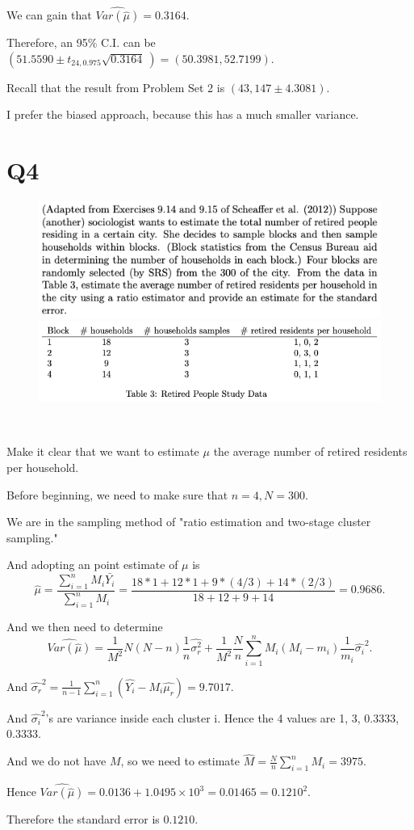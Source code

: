 \documentclass[12pt]{article}%
\begin{document}
We can gain that $\widehat{Var(\hat{\mu})}=0.3164.$

Therefore, an 95\% C.I. can be $(51.5590 \pm t_{24,0.975}\sqrt{0.3164}~)=(50.3981,52.7199).$

Recall that the result from Problem Set 2 is $(43,147 \pm 4.3081).$

I prefer the biased approach, because this has a much smaller variance.

\newpage
\section{Q4}
\begin{figure}[htp]
    \includegraphics[width = 14cm]{img/Q4.png}
    \includegraphics[width = 14cm]{img/Q3(2).png}
\end{figure}


~\ 

Make it clear that we want to estimate $\mu$ the average number of retired residents per household.

Before beginning, we need to make sure that $n=4, N=300.$

We are in the sampling method of "ratio estimation and two-stage cluster sampling."

And adopting an point estimate of $\mu$ is 
$$\hat{\mu}=\frac{\sum_{i=1}^n M_i\bar{Y_i}}{\sum_{i=1}^{n}M_i}=\frac{ 18*1+12*1+9*(4/3)+14*(2/3)  }{ 18+12+9+14 }=0.9686.$$

And we then need to determine 
$$\widehat{Var(\hat{\mu})}=\frac{1}{M^2}N(N-n)\frac{1}{n}\hat{\sigma_r^2}+\frac{1}{M^2}\frac{N}{n}\sum_{i=1}^n M_i(M_i-m_i)\frac{1}{m_i}\hat{\sigma_i}^2.$$

And $\hat{\sigma_r}^2=\frac{1}{n-1}\sum_{i=1}^n(\hat{Y_i}-M_i \hat{\mu_r})=9.7017.$

And $\hat{\sigma_i}^2$'s are variance inside each cluster i. 
Hence the 4 values are 1, 3, 0.3333, 0.3333.

And we do not have $M$, so we need to estimate 
$\hat{M}=\frac{N}{n}\sum_{i=1}^n M_i=3975.$

Hence $\widehat{Var(\hat{\mu})}=0.0136+1.0495\times 10^3=0.01465=0.1210^2.$

Therefore the standard error is $0.1210.$
\end{document}
